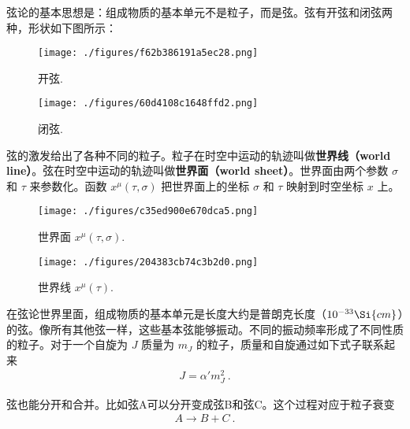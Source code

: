 
\begin{issues}
\issueNeedCite
\issueMissDepend
\end{issues}

弦论的基本思想是：组成物质的基本单元不是粒子，而是弦。弦有开弦和闭弦两种，形状如下图所示：
\begin{figure}[ht]
\centering
\texttt{[image: ./figures/f62b386191a5ec28.png]}
\caption{开弦.} \label{fig_STover_1}
\end{figure}
\begin{figure}[ht]
\centering
\texttt{[image: ./figures/60d4108c1648ffd2.png]}
\caption{闭弦.} \label{fig_STover_2}
\end{figure}
弦的激发给出了各种不同的粒子。粒子在时空中运动的轨迹叫做\textbf{世界线（world line）}。弦在时空中运动的轨迹叫做\textbf{世界面（world sheet）}。世界面由两个参数 $\sigma$ 和 $\tau$ 来参数化。函数 $x^\mu(\tau,\sigma)$ 把世界面上的坐标 $\sigma$ 和 $\tau$ 映射到时空坐标 $x$ 上。

\begin{figure}[ht]
\centering
\texttt{[image: ./figures/c35ed900e670dca5.png]}
\caption{世界面 $x^\mu (\tau,\sigma)$.} \label{fig_STover_3}
\end{figure}

\begin{figure}[ht]
\centering
\texttt{[image: ./figures/204383cb74c3b2d0.png]}
\caption{世界线 $x^\mu(\tau)$.} \label{fig_STover_4}
\end{figure}

在弦论世界里面，组成物质的基本单元是长度大约是普朗克长度（$10^{-33}\Si{cm}$）的弦。像所有其他弦一样，这些基本弦能够振动。不同的振动频率形成了不同性质的粒子。对于一个自旋为 $J$ 质量为 $m_J$ 的粒子，质量和自旋通过如下式子联系起来
\begin{align}
J = \alpha' m_J^2~.
\end{align}

弦也能分开和合并。比如弦A可以分开变成弦B和弦C。这个过程对应于粒子衰变
\begin{align}
A \rightarrow B + C~.
\end{align}


